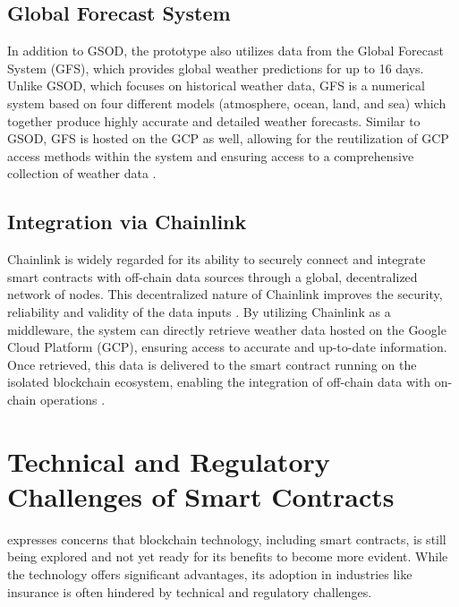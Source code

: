 \subsection{Global Forecast System}\label{GFS}
In addition to GSOD, the prototype also utilizes data from the Global Forecast System (GFS), which provides global weather predictions for up to 16 days. Unlike GSOD, which focuses on historical weather data, GFS is a numerical system based on four different models (atmosphere, ocean, land, and sea) which together produce highly accurate and detailed weather forecasts. Similar to GSOD, GFS is hosted on the GCP as well, allowing for the reutilization of GCP access methods within the system and ensuring access to a comprehensive collection of weather data \autocite{NOAA_GSOD_2020}.

\subsection{Integration via Chainlink}
Chainlink is widely regarded for its ability to securely connect and integrate smart contracts with off-chain data sources through a global, decentralized network of nodes. This decentralized nature of Chainlink improves the security, reliability and validity of the data inputs \autocite{beniiche2020study}. By utilizing Chainlink as a middleware, the system can directly retrieve weather data hosted on the Google Cloud Platform (GCP), ensuring access to accurate and up-to-date information. Once retrieved, this data is delivered to the smart contract running on the isolated blockchain ecosystem, enabling the integration of off-chain data with on-chain operations \autocite{goswami2022towards}.

\section{Technical and Regulatory Challenges of Smart Contracts}\label{section:regulatory_technical_challenges}
\textcite{gatteschi2018blockchain} expresses concerns that blockchain technology, including smart contracts, is still being explored and not yet ready for its benefits to become more evident. While the technology offers significant advantages, its adoption in industries like insurance is often hindered by technical and regulatory challenges.

